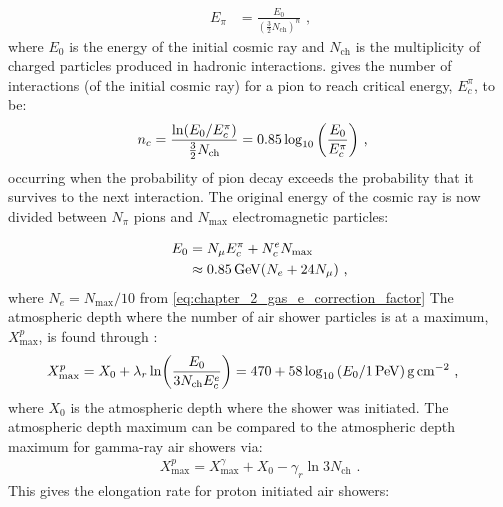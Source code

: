\begin{equation}
    \begin{aligned}
    E_\pi &=\frac{E_0}{(\frac{3}{2}N_\text{ch})^n}\text{ ,}
    \end{aligned}
\end{equation}
\noindent where $E_0$ is the energy of the initial cosmic ray and $N_\text{ch}$ is the multiplicity of charged particles produced in hadronic interactions.
\newpar
\cite{MATTHEWS2005387} gives the number of interactions (of the initial cosmic ray) for a pion to reach critical energy, $E_c^\pi$, to be:
\begin{equation}
    \begin{aligned}
    n_c&=\frac{\ln(E_0/E_c^\pi)}{\frac{3}{2}N_\text{ch}}=0.85\log_{10}\qty(\frac{E_0}{E_c^\pi}) \text{ ,}
    \end{aligned}
\end{equation}
\noindent occurring when the probability of pion decay exceeds the probability that it survives to the next interaction. The original energy of the cosmic ray is now divided between $N_\pi$ pions and $N_\text{max}$ electromagnetic particles:

\begin{equation}
    \begin{aligned}
    E_0&=N_\mu E_c^\pi + N_c^e N_\text{max} \\
 &\approx 0.85\,\si{\giga\electronvolt}\qty(N_e+24 N_\mu)\text{ ,}
    \end{aligned}
\end{equation}
\noindent where $N_e=N_\text{max}/10$ from \autoref{eq:chapter_2_gas_e_correction_factor}
\newpar
The atmospheric depth where the number of air shower particles is at a maximum, $X_\text{max}^p$, is found through \citep{MATTHEWS2005387}:
\begin{equation}
    \begin{aligned}
    X_\text{max}^p&= X_0 + \lambda_r\ln(\frac{E_0}{3N_\text{ch}E_c^e}) =470+58\log_{10}\qty(E_0/1\,\PeV)\,\grampercentimetresquared \text{ ,}  
    \end{aligned}
\end{equation}
\noindent where $X_0$ is the atmospheric depth where the shower was initiated. The atmospheric depth maximum can be compared to the atmospheric depth maximum for gamma-ray air showers via:
\begin{equation}
    \begin{aligned}
    X_\text{max}^p=X_\text{max}^\gamma+X_0-\gamma_r\ln 3N_\text{ch}\text{ .}
    \end{aligned}
\end{equation}
\noindent This gives the elongation rate for proton initiated air showers:

